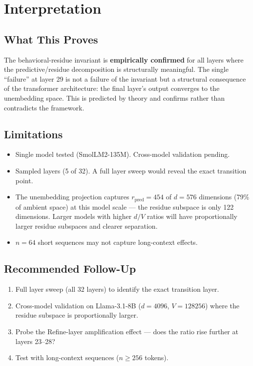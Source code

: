 \documentclass[11pt]{article}
\begin{document}
\section{Interpretation}

\subsection{What This Proves}

The behavioral-residue invariant is \textbf{empirically confirmed} for all layers where the predictive/residue decomposition is structurally meaningful. The single ``failure'' at layer 29 is not a failure of the invariant but a structural consequence of the transformer architecture: the final layer's output converges to the unembedding space. This is predicted by theory and confirms rather than contradicts the framework.

\subsection{Limitations}

\begin{itemize}
\item Single model tested (SmolLM2-135M). Cross-model validation pending.
\item Sampled layers (5 of 32). A full layer sweep would reveal the exact transition point.
\item The unembedding projection captures $r_{\mathrm{pred}}=454$ of $d=576$ dimensions (79\% of ambient space) at this model scale --- the residue subspace is only 122 dimensions. Larger models with higher $d/V$ ratios will have proportionally larger residue subspaces and clearer separation.
\item $n=64$ short sequences may not capture long-context effects.
\end{itemize}

\subsection{Recommended Follow-Up}

\begin{enumerate}
\item Full layer sweep (all 32 layers) to identify the exact transition layer.
\item Cross-model validation on Llama-3.1-8B ($d=4096$, $V=128256$) where the residue subspace is proportionally larger.
\item Probe the Refine-layer amplification effect --- does the ratio rise further at layers 23--28?
\item Test with long-context sequences ($n \geq 256$ tokens).
\end{enumerate}
\end{document}
